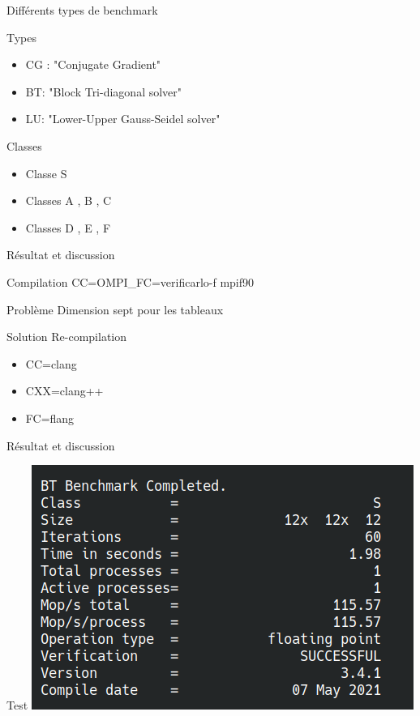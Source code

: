 \documentclass{beamer}
\begin{document}
\begin{frame}{ Différents types de benchmark}

  \begin{block}{Types}
    \begin{itemize}
    \item CG : "Conjugate Gradient" 
    \item BT: "Block Tri-diagonal solver"
    \item LU: "Lower-Upper Gauss-Seidel solver"
    \end{itemize}
  \end{block}
  
  \begin{block}{Classes}
    \begin{itemize}
    \item Classe S 
    \item  Classes A , B , C 
    \item Classes D , E , F
    \end{itemize}
  \end{block}
  
\end{frame}

\begin{frame}{ Résultat et discussion}

  \begin{block}{Compilation}
    CC=OMPI\_FC=verificarlo-f  mpif90
  \end{block}
  
  \begin{block}{Problème}
    Dimension sept pour les tableaux
  \end{block}
  
  \begin{block}{Solution}
    Re-compilation
    \begin{itemize}
    \item CC=clang
    \item CXX=clang++
    \item FC=flang
    \end{itemize}
  \end{block}

\end{frame}

\begin{frame}{Résultat et discussion}

  \begin{block}{Test}
    \includegraphics[width=0.6\linewidth]{../ressources/btcompleted.png}
  \end{block}

\end{frame}
\end{document}
